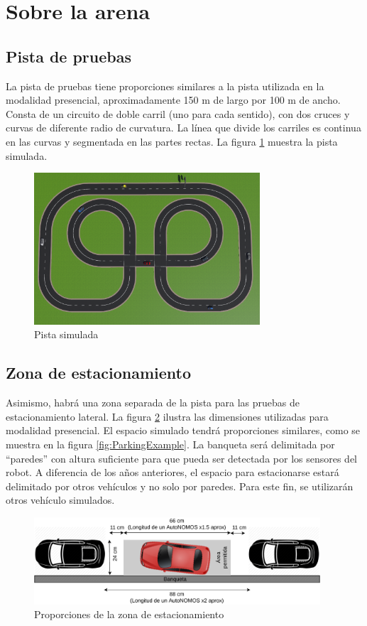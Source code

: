 \documentclass[letterpaper,12pt]{article}
\begin{document}
\section{Sobre la arena}
\subsection{Pista de pruebas}
La pista de pruebas tiene proporciones similares a la pista utilizada en la modalidad presencial, aproximadamente 150 m de largo por 100 m de ancho. Consta de un circuito de doble carril (uno para cada sentido), con dos cruces y curvas de diferente radio de curvatura. La línea que divide los carriles es continua en las curvas y segmentada en las partes rectas. La figura \ref{fig:Pista} muestra la pista simulada. 
\begin{figure}
  \centering
  \includegraphics[width=0.75\textwidth]{Figures/Pista.png}
  \caption{Pista simulada}
  \label{fig:Pista}
\end{figure}

\subsection{Zona de estacionamiento}
Asimismo, habrá una zona separada de la pista para las pruebas de estacionamiento lateral. La figura \ref{fig:Parking} ilustra las dimensiones utilizadas para modalidad presencial. El espacio simulado tendrá proporciones similares, como se muestra en la figura \ref{fig:ParkingExample}. La banqueta será delimitada por “paredes” con altura suficiente para que pueda ser detectada por los sensores del robot. A diferencia de los años anteriores, el espacio para estacionarse estará delimitado por otros vehículos y no solo por paredes. Para este fin, se utilizarán otros vehículo simulados. 
\begin{figure}
  \centering
  \includegraphics[width=0.95\textwidth]{Figures/Parking.pdf}
  \caption{Proporciones de la zona de estacionamiento}
  \label{fig:Parking}
\end{figure}
\end{document}
